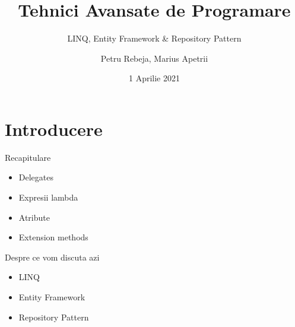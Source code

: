 \documentclass[presentation]{beamer}
\author{Petru Rebeja, Marius Apetrii}
\date{1 Aprilie 2021}
\title{Tehnici Avansate de Programare}
\subtitle{LINQ, Entity Framework \& Repository Pattern}
\institute[UAIC]{Facultatea de Matematică\\Universitatea Alexandru Ioan Cuza, Iași}
\begin{document}
\maketitle
\section{Introducere}
\label{sec:orgad7f6cf}
\begin{frame}[label={sec:orge30d458}]{Recapitulare}
\begin{itemize}
\item Delegates
\item Expresii lambda
\item Atribute
\item Extension methods
\end{itemize}
\end{frame}
\begin{frame}[label={sec:org83de9d1}]{Despre ce vom discuta azi}
\begin{itemize}
\item LINQ
\item Entity Framework
\item Repository Pattern
\end{itemize}
\end{frame}
\end{document}
